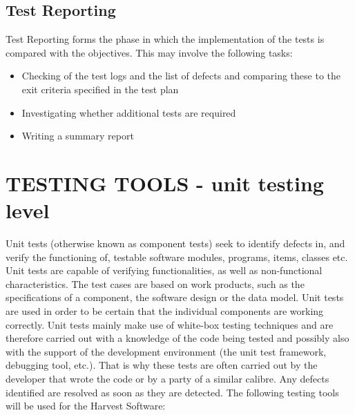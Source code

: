 \documentclass[12pt]{article}
\begin{document}
\subsection{Test Reporting}
Test Reporting forms the phase in which the implementation of the tests is compared with the objectives. This may involve the following tasks: \newline
\begin{itemize}
 \item Checking of the test logs and the list of defects and comparing these to the exit criteria specified in the test plan   
\item Investigating whether additional tests are required
\item Writing a summary report 
\end{itemize}

  \section{TESTING TOOLS - unit testing level}
Unit tests (otherwise known as component tests) seek to identify defects in, and verify the functioning of, testable software modules, programs, items, classes etc. \newline\newline
Unit tests are capable of verifying functionalities, as well as non-functional characteristics. The test cases are based on work products, such as the specifications of a component, the software design or the data model. Unit tests are used in order to be certain that the individual components are working correctly. \newline\newline 
Unit tests mainly make use of white-box testing techniques and are therefore carried out with a knowledge of the code being tested and possibly also with the support of the development environment (the unit test framework, debugging tool, etc.). That is why these tests are often carried out by the developer that wrote the code or by a party of a similar calibre. Any defects identified are resolved as soon as they are detected. \newline\newline
The following testing tools will be used for the Harvest Software: \newline\newline
\end{document}

